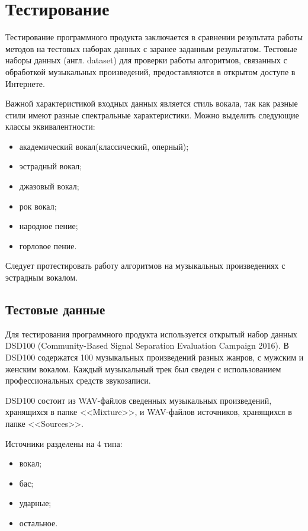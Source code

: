 \section{Тестирование}

Тестирование программного продукта заключается в сравнении результата работы методов на тестовых наборах данных с заранее заданным результатом. Тестовые наборы данных (англ. dataset) для проверки работы алгоритмов, связанных с обработкой музыкальных произведений, предоставляются в открытом доступе в Интернете.

Важной характеристикой входных данных является стиль вокала, так как разные стили имеют разные спектральные характеристики. Можно выделить следующие классы эквивалентности:

\begin{itemize}
	\item академический вокал(классический, оперный);
	\item эстрадный вокал;
	\item джазовый вокал;
	\item рок вокал;
	\item народное пение;
	\item горловое пение.
\end{itemize}

Следует протестировать работу алгоритмов на музыкальных произведениях с эстрадным вокалом.

\subsection{Тестовые данные}

Для тестирования программного продукта используется открытый набор данных DSD100 (Community-Based Signal Separation Evaluation Campaign 2016). В DSD100 содержатся 100 музыкальных произведений разных жанров, с мужским и женским вокалом. Каждый музыкальный трек был сведен с использованием профессиональных средств звукозаписи.

DSD100 состоит из WAV-файлов сведенных музыкальных произведений, хранящихся в папке <<Mixture>>, и WAV-файлов источников, хранящихся в папке <<Sources>>.

Источники разделены на 4 типа:

\begin{itemize}
	\item вокал;
	\item бас;
	\item ударные;
	\item остальное.
\end{itemize}

